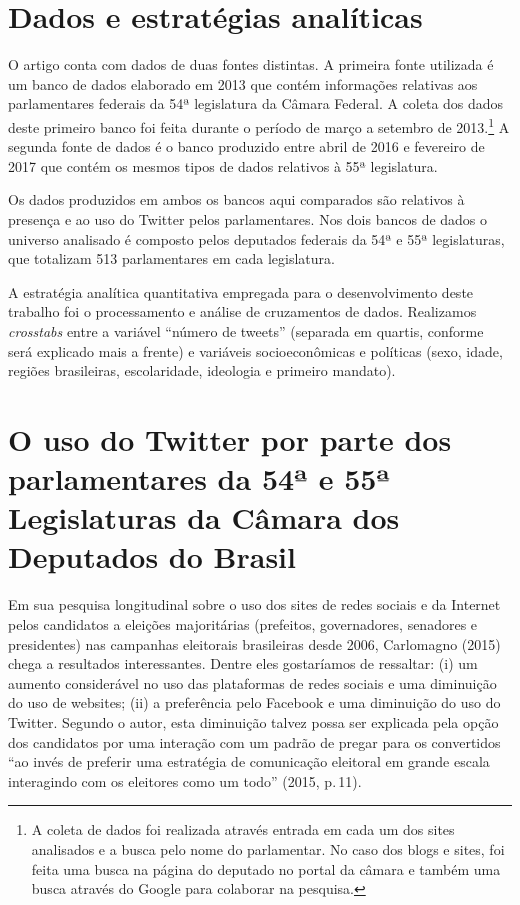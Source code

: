\section{Dados e estratégias analíticas}

O artigo conta com dados de duas fontes distintas. A primeira fonte
utilizada é um banco de dados elaborado em 2013 que contém informações
relativas aos parlamentares federais da 54ª legislatura da Câmara
Federal. A coleta dos dados deste primeiro banco foi feita durante o
período de março a setembro de 2013.\footnote{A coleta de dados foi
  realizada através entrada em cada um dos sites analisados e a busca
  pelo nome do parlamentar. No caso dos blogs e sites, foi feita uma
  busca na página do deputado no portal da câmara e também uma busca
  através do Google para colaborar na pesquisa.} A segunda fonte de
dados é o banco produzido entre abril de 2016 e fevereiro de 2017 que
contém os mesmos tipos de dados relativos à 55ª legislatura.

Os dados produzidos em ambos os bancos aqui comparados são relativos à
presença e ao uso do Twitter pelos parlamentares. Nos dois bancos de
dados o universo analisado é composto pelos deputados federais da 54ª e
55ª legislaturas, que totalizam 513 parlamentares em cada legislatura.

A estratégia analítica quantitativa empregada para o desenvolvimento
deste trabalho foi o processamento e análise de cruzamentos de dados.
Realizamos \emph{crosstabs} entre a variável ``número de tweets''
(separada em quartis, conforme será explicado mais a frente) e variáveis
socioeconômicas e políticas (sexo, idade, regiões brasileiras,
escolaridade, ideologia e primeiro mandato).

\section{O uso do Twitter por parte dos parlamentares da 54ª e 55ª
Legislaturas da Câmara dos Deputados do Brasil}

Em sua pesquisa longitudinal sobre o uso dos sites de redes sociais e da
Internet pelos candidatos a eleições majoritárias (prefeitos,
governadores, senadores e presidentes) nas campanhas eleitorais
brasileiras desde 2006, Carlomagno (2015) chega a resultados
interessantes. Dentre eles gostaríamos de ressaltar: (i) um aumento
considerável no uso das plataformas de redes sociais e uma diminuição do
uso de websites; (ii) a preferência pelo Facebook e uma diminuição do
uso do Twitter. Segundo o autor, esta diminuição talvez possa ser
explicada pela opção dos candidatos por uma interação com um padrão de
pregar para os convertidos ``ao invés de preferir uma estratégia de
comunicação eleitoral em grande escala interagindo com os eleitores como
um todo'' (2015, p.\,11).

